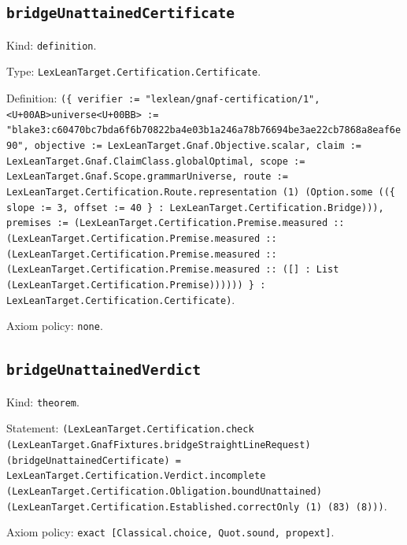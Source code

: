 \documentclass[11pt]{article}
\begin{document}
\subsection*{\texttt{bridgeUnattainedCertificate}}
\noindent Kind: \texttt{definition}.\par
\noindent Type: \texttt{LexLeanTarget.Certification.Certificate}.\par
\noindent Definition: \texttt{(\{ verifier := "lexlean/gnaf-certification/1", <U+00AB>universe<U+00BB> := "blake3:c60470bc7bda6f6b70822ba4e03b1a246a78b76694be3ae22cb7868a8eaf6e90", objective := LexLeanTarget.Gnaf.Objective.scalar, claim := LexLeanTarget.Gnaf.ClaimClass.globalOptimal, scope := LexLeanTarget.Gnaf.Scope.grammarUniverse, route := LexLeanTarget.Certification.Route.representation (1) (Option.some ((\{ slope := 3, offset := 40 \} : LexLeanTarget.Certification.Bridge))), premises := (LexLeanTarget.Certification.Premise.measured :: (LexLeanTarget.Certification.Premise.measured :: (LexLeanTarget.Certification.Premise.measured :: (LexLeanTarget.Certification.Premise.measured :: ([] : List (LexLeanTarget.Certification.Premise)))))) \} : LexLeanTarget.Certification.Certificate)}.\par
\noindent Axiom policy: \texttt{none}.\par
\subsection*{\texttt{bridgeUnattainedVerdict}}
\noindent Kind: \texttt{theorem}.\par
\noindent Statement: \texttt{(LexLeanTarget.Certification.check (LexLeanTarget.GnafFixtures.bridgeStraightLineRequest) (bridgeUnattainedCertificate) = LexLeanTarget.Certification.Verdict.incomplete (LexLeanTarget.Certification.Obligation.boundUnattained) (LexLeanTarget.Certification.Established.correctOnly (1) (83) (8)))}.\par
\noindent Axiom policy: \texttt{exact [Classical.choice, Quot.sound, propext]}.\par
\end{document}
